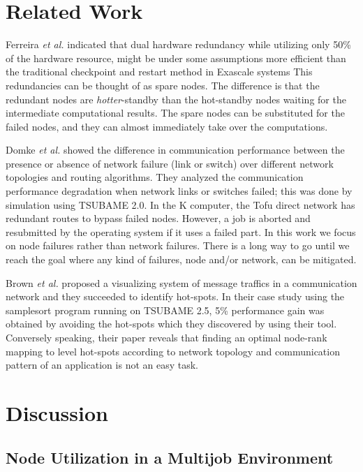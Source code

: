 \documentclass[Afour,times,sagev]{sagej}
\begin{document}
\section{Related Work}\label{sec:related-work}

Ferreira {\it et al.} indicated that dual hardware redundancy while
utilizing only 50\% of the hardware resource, might be under some
assumptions more efficient than the traditional checkpoint and restart
method in Exascale systems This redundancies can be thought of as
spare nodes. The difference is that the redundant nodes are {\it
  hotter}-standby than the hot-standby nodes waiting for the
intermediate computational results. The spare nodes can be substituted
for the failed nodes, and they can almost immediately take over the
computations.

Domke {\it et al.} showed the difference in communication performance
between the presence or absence of network failure (link or switch)
over different network topologies and routing
algorithms\citep{Domke:2014:FND:2683593.2683659}. They analyzed the
communication performance degradation when network links or switches
failed; this was done by simulation using TSUBAME 2.0. In the K
computer, the Tofu direct network has redundant routes to bypass
failed nodes. However, a job is aborted and resubmitted by the
operating system if it uses a failed part. In this work we focus on
node failures rather than network failures. There is a
long way to go until we reach the goal where any kind of failures,
node and/or network, can be mitigated.

Brown {\it et al.} proposed a visualizing system of message traffics
in a communication network\cite{7384355} and they succeeded to
identify hot-spots. In their case study using the samplesort program
running on TSUBAME 2.5, 5\% performance gain was obtained by avoiding
the hot-spots which they discovered by using their tool. Conversely
speaking, their paper reveals that finding an optimal node-rank
mapping to level hot-spots according to network topology and
communication pattern of an application is not an easy task.

\section{Discussion}

\subsection{Node Utilization in a Multijob Environment}
\label{label:multi-job}
\end{document}
